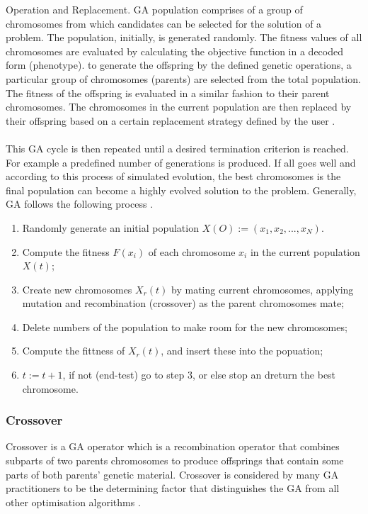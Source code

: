 \documentclass[a4paper, 11pt]{article}
\begin{document}
    Operation and Replacement. GA population comprises of a group of chromosomes from which candidates can be selected for the
    solution of a problem. The population, initially, is generated randomly. The fitness values of all chromosomes are 
    evaluated by calculating the objective function in a decoded form (phenotype). to generate the offspring by the defined 
    genetic operations, a particular group of chromosomes (parents) are selected from the total population. The fitness of the 
    offspring is evaluated in a similar fashion to their parent chromosomes. The chromosomes in the current population are then 
    replaced by their offspring based on a certain replacement strategy defined by the user \cite{Tang1996}.
    \\\\
    This GA cycle is then repeated until a desired termination criterion is reached. For example a predefined number of generations
    is produced. If all goes well and according to this process of simulated evolution, the best chromosomes is the final population 
    can become a highly evolved solution to the problem. Generally, GA follows the following process \cite{Tang1996}.

    \begin{enumerate}
       \item Randomly generate an initial population $X(O):= (x_{1}, x_{2}, ..., x_{N})$.
       \item Compute the fitness $F(x_{i})$ of each chromosome $x_{i}$ in the  current population $X(t)$;
       \item Create new chromosomes $X_{r}(t)$ by mating current chromosomes, applying mutation and recombination (crossover) as the 
       parent chromosomes mate;
       \item Delete numbers of the population  to make room for the new chromosomes;
       \item Compute the fittness of $X_{r}(t)$, and insert these into the popuation;
       \item $t:= t + 1$, if not (end-test) go to step 3, or else stop an dreturn the best chromosome.
   \end{enumerate}

        \subsubsection{Crossover}
            Crossover is a GA operator which is a recombination operator that combines subparts of two parents 
            chromosomes to produce offsprings that contain some parts of both parents' genetic material. Crossover
            is considered by many GA practitioners to be the determining factor that distinguishes the GA from
            all other optimisation algorithms \cite{Tang1996}.
\end{document}
